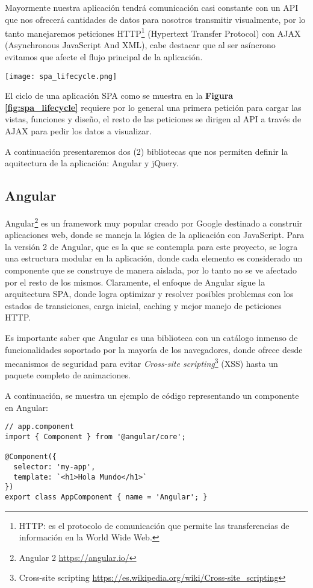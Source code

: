 Mayormente nuestra aplicación tendrá comunicación casi constante con un API que nos ofrecerá cantidades de datos para nosotros transmitir visualmente, por lo tanto manejaremos peticiones HTTP\footnote{HTTP: es el protocolo de comunicación que permite las transferencias de información en la World Wide Web.} (Hypertext Transfer Protocol) con AJAX \cite{AJAX} (Asynchronous JavaScript And XML), cabe destacar que al ser asíncrono evitamos que afecte el flujo principal de la aplicación.
\bigbreak
\begin{center}
\texttt{[image: spa\_lifecycle.png]}
\label{fig:spa_lifecycle}
\end{center}
\bigbreak
El ciclo de una aplicación SPA como se muestra en la \textbf{Figura \ref{fig:spa_lifecycle}} requiere por lo general una primera petición para cargar las vistas, funciones y diseño, el resto de las peticiones se dirigen al API a través de AJAX para pedir los datos a visualizar.

A continuación presentaremos dos (2) bibliotecas que nos permiten definir la aquitectura de la aplicación: Angular y jQuery.

\subsection{Angular}
Angular\footnote{Angular 2 \url{https://angular.io/}} es un framework muy popular creado por Google destinado a construir aplicaciones web, donde se maneja la lógica de la aplicación con JavaScript. Para la versión 2 de Angular, que es la que se contempla para este proyecto, se logra una estructura modular en la aplicación, donde cada elemento es considerado un componente que se construye de manera aislada, por lo tanto no se ve afectado por el resto de los mismos. Claramente, el enfoque de Angular sigue la arquitectura SPA, donde logra optimizar y resolver posibles problemas con los estados de transiciones, carga inicial, caching y mejor manejo de peticiones HTTP.

Es importante saber que Angular es una biblioteca con un catálogo inmenso de funcionalidades soportado por la mayoría de los navegadores, donde ofrece desde mecanismos de seguridad para evitar \textit{Cross-site scripting}\footnote{Cross-site scripting \url{https://es.wikipedia.org/wiki/Cross-site_scripting}} (XSS) hasta un paquete completo de animaciones.

A continuación, se muestra un ejemplo de código representando un componente en Angular:
\begin{lstlisting}
// app.component
import { Component } from '@angular/core';

@Component({
  selector: 'my-app',
  template: `<h1>Hola Mundo</h1>`
})
export class AppComponent { name = 'Angular'; }
\end{lstlisting}

